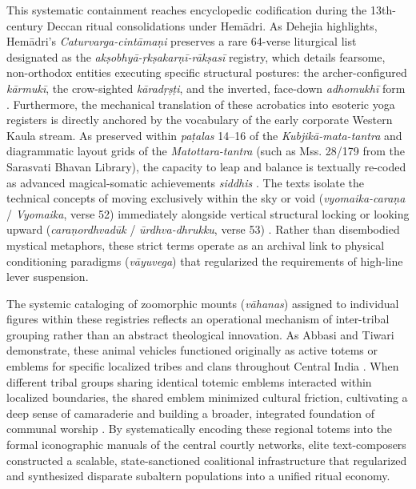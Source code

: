 \documentclass[11pt,twoside,letterpaper]{article}
\begin{document}
This systematic containment reaches encyclopedic codification during the 13th-century Deccan ritual consolidations under Hemādri. As Dehejia highlights, Hemādri’s \textit{Caturvarga-cintāmaṇi} preserves a rare 64-verse liturgical list designated as the \textit{akṣobhyā-ṛkṣakarṇī-rākṣasī} registry, which details fearsome, non-orthodox entities executing specific structural postures: the archer-configured \textit{kārmukī}, the crow-sighted \textit{kāradṛṣṭi}, and the inverted, face-down \textit{adhomukhī} form \citep{Dehejia1986}. Furthermore, the mechanical translation of these acrobatics into esoteric yoga registers is directly anchored by the vocabulary of the early corporate Western Kaula stream. As preserved within \textit{paṭalas} 14–16 of the \textit{Kubjikā-mata-tantra} and diagrammatic layout grids of the \textit{ Matottara-tantra} (such as Mss. 28/179 from the Sarasvati Bhavan Library), the capacity to leap and balance is textually re-coded as advanced magical-somatic achievements \textit{siddhis} \citep{Dehejia1986}. The texts isolate the technical concepts of moving exclusively within the sky or void (\textit{vyomaika-caraṇa} / \textit{Vyomaika}, verse 52) immediately alongside vertical structural locking or looking upward (\textit{caraṇordhvadūk} / \textit{ūrdhva-dhrukku}, verse 53) \citep{Dehejia1986, Mallinson2007}. Rather than disembodied mystical metaphors, these strict terms operate as an archival link to physical conditioning paradigms (\textit{vāyuvega}) that regularized the requirements of high-line lever suspension.

The systemic cataloging of zoomorphic mounts (\textit{vāhanas}) assigned to individual figures within these registries reflects an operational mechanism of inter-tribal grouping rather than an abstract theological innovation. As Abbasi and Tiwari demonstrate, these animal vehicles functioned originally as active totems or emblems for specific localized tribes and clans throughout Central India \citep{Abbasi2001}. When different tribal groups sharing identical totemic emblems interacted within localized boundaries, the shared emblem minimized cultural friction, cultivating a deep sense of camaraderie and building a broader, integrated foundation of communal worship \citep{Abbasi2001}. By systematically encoding these regional totems into the formal iconographic manuals of the central courtly networks, elite text-composers constructed a scalable, state-sanctioned coalitional infrastructure that regularized and synthesized disparate subaltern populations into a unified ritual economy.
\end{document}
